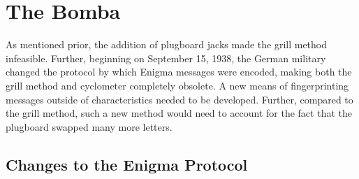 \section{The Bomba}

As mentioned prior, the addition of plugboard jacks made the grill
method infeasible.
Further, beginning on September 15, 1938, the German military changed
the protocol by which Enigma messages were encoded, making both the grill
method and cyclometer completely obsolete. A new means of
fingerprinting messages
outside of characteristics needed to be developed. Further, compared
to the grill method, such a new method would need to account for the
fact that the plugboard swapped many more letters.

\subsection{Changes to the Enigma Protocol}

